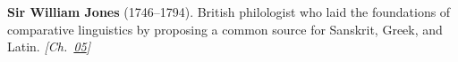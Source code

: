 \textbf{Sir William Jones} (1746–1794). British philologist who laid the foundations of comparative linguistics by proposing a common source for Sanskrit, Greek, and Latin. \emph{[Ch.~\hyperref[ch:circlewheel]{05}]}

